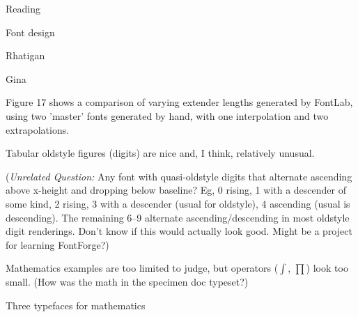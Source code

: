 \documentclass[12pt]{PalisadesLakesBook}
\begin{document}
\begin{plSection}{Reading}
\begin{plSection}{Font design}
\begin{plSection}{Rhatigan}
\begin{plSection}{Gina}
\begin{plSection}{}
Figure 17 shows a comparison of varying extender lengths
generated by FontLab, using two 'master' fonts generated by hand,
with one interpolation and two extrapolations.


\end{plSection}%
\begin{plSection}{}

Tabular oldstyle figures (digits) are nice and, I think,
relatively unusual.

(\emph{Unrelated Question:} 
Any font with quasi-oldstyle digits that alternate 
ascending above x-height and dropping below baseline?
Eg, 0 rising, 1 with a descender of some kind, 2 rising, 3 with
a descender (usual for oldstyle), 4 ascending (usual is descending).
The remaining 6--9 alternate ascending/descending in most
oldstyle digit renderings.
Don't know if this would actually look good.
Might be a project for learning FontForge?)

Mathematics examples are too limited to judge, 
but operators ($\int$, $\prod$) look too small. 
(How was the math in the specimen doc typeset?)

\end{plSection}%
\end{plSection}%
\begin{plSection}{Three typefaces for mathematics}


\end{plSection}%
\end{plSection}%
\end{plSection}%
\end{plSection}%
\end{document}
